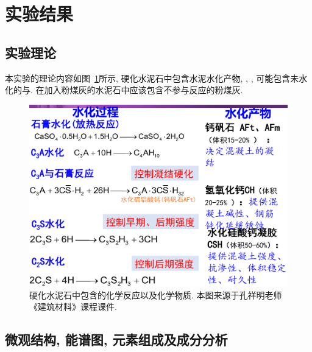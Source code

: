 
\section{实验结果}

\subsection{实验理论}
本实验的理论内容如图~\ref{fig:mechanism}所示, 硬化水泥石中包含水泥水化产物, , , 可能包含未水化的与. 在加入粉煤灰的水泥石中应该包含不参与反应的粉煤灰.

\begin{figure}[!t]
  \centering
  \includegraphics[width = 0.6\linewidth]{figures/exp3/mechanism.png}
  \caption{硬化水泥石中包含的化学反应以及化学物质. 本图来源于孔祥明老师《建筑材料》课程课件. }
  \label{fig:mechanism}
\end{figure}

\subsection{微观结构, 能谱图, 元素组成及成分分析}

